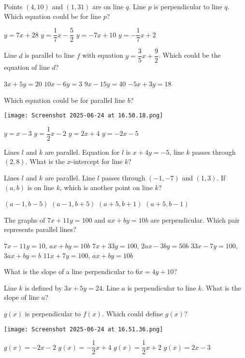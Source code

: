 \documentclass[12pt]{exam}
\begin{document}
\begin{questions}
\question Points $(4,10)$ and $(1,31)$ are on line $q$. Line $p$ is perpendicular to line $q$. Which equation could be for line $p$?
\begin{choices}
\choice $y = 7x + 28$
\choice $y = \dfrac{1}{7}x - \dfrac{5}{2}$
\choice $y = -7x + 10$
\choice $y = -\dfrac{1}{7}x + 2$
\end{choices}

\question Line $d$ is parallel to line $f$ with equation $y = \dfrac{3}{5}x + \dfrac{9}{2}$. Which could be the equation of line $d$?
\begin{choices}
\choice $3x + 5y = 20$
\choice $10x - 6y = 3$
\choice $9x - 15y = 40$
\choice $-5x + 3y = 18$
\end{choices}

\question Which equation could be for parallel line $b$?
\begin{center}
\texttt{[image: Screenshot 2025-06-24 at 16.50.18.png]}
\end{center}
\begin{choices}
\choice $y = x - 3$
\choice $y = \dfrac{1}{2}x - 2$
\choice $y = 2x + 4$
\choice $y = -2x - 5$
\end{choices}

\question Lines $l$ and $k$ are parallel. Equation for $l$ is $x + 4y = -5$, line $k$ passes through $(2,8)$. What is the $x$-intercept for line $k$?

\question Lines $l$ and $k$ are parallel. Line $l$ passes through $(-1,-7)$ and $(1,3)$. If $(a,b)$ is on line $k$, which is another point on line $k$?
\begin{choices}
\choice $(a-1,b-5)$
\choice $(a-1,b+5)$
\choice $(a+5,b+1)$
\choice $(a+5,b-1)$
\end{choices}

\question The graphs of $7x + 11y = 100$ and $ax + by = 10b$ are perpendicular. Which pair represents parallel lines?
\begin{choices}
\choice $7x - 11y = 10$, $ax + by = 10b$
\choice $7x + 33y = 100$, $2ax - 3by = 50b$
\choice $33x - 7y = 100$, $3ax + by = b$
\choice $11x + 7y = 100$, $ax + by = 10b$
\end{choices}

\question What is the slope of a line perpendicular to $6x = 4y + 10$?

\question Line $k$ is defined by $3x + 5y = 24$. Line $a$ is perpendicular to line $k$. What is the slope of line $a$?

\question $g(x)$ is perpendicular to $f(x)$. Which could define $g(x)$?
\begin{center}
\texttt{[image: Screenshot 2025-06-24 at 16.51.36.png]}
\end{center}
\begin{choices}
\choice $g(x) = -2x - 2$
\choice $g(x) = -\dfrac{1}{2}x + 4$
\choice $g(x) = \dfrac{1}{2}x + 2$
\choice $g(x) = 2x - 3$
\end{choices}


\end{questions}
\end{document}
